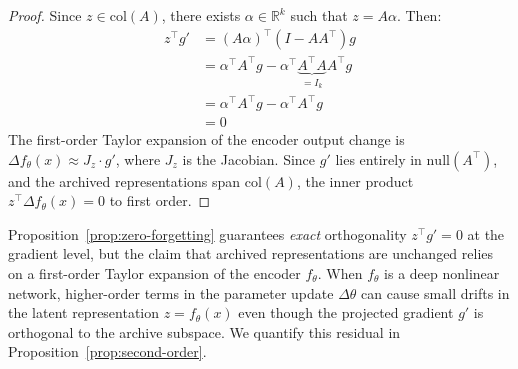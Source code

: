 \begin{proof}
Since $z \in \mathrm{col}(A)$, there exists $\alpha \in \mathbb{R}^k$ such
that $z = A\alpha$. Then:
\begin{align}
    z^\top g' &= (A\alpha)^\top (I - AA^\top) g \\
              &= \alpha^\top A^\top g - \alpha^\top \underbrace{A^\top A}_{= I_k} A^\top g \\
              &= \alpha^\top A^\top g - \alpha^\top A^\top g \\
              &= 0
\end{align}
The first-order Taylor expansion of the encoder output change is
$\Delta f_\theta(x) \approx J_z \cdot g'$, where $J_z$ is the Jacobian.
Since $g'$ lies entirely in $\mathrm{null}(A^\top)$, and the archived
representations span $\mathrm{col}(A)$, the inner product
$z^\top \Delta f_\theta(x) = 0$ to first order.
\end{proof}

\begin{remark}
\label{rem:first-order}
Proposition~\ref{prop:zero-forgetting} guarantees \emph{exact} orthogonality
$z^\top g' = 0$ at the gradient level, but the claim that archived
representations are unchanged relies on a first-order Taylor expansion of
the encoder $f_\theta$. When $f_\theta$ is a deep nonlinear network,
higher-order terms in the parameter update $\Delta \theta$ can cause
small drifts in the latent representation $z = f_\theta(x)$ even though
the projected gradient $g'$ is orthogonal to the archive subspace.
We quantify this residual in Proposition~\ref{prop:second-order}.
\end{remark}

